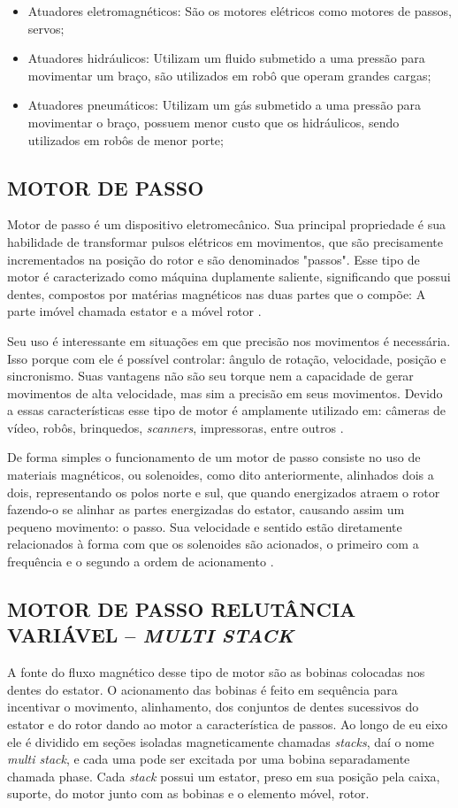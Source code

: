 \begin{itemize}
\item Atuadores eletromagnéticos: São os motores elétricos como motores de passos, servos;
\item Atuadores hidráulicos: Utilizam um fluido submetido a uma pressão para movimentar um braço, são utilizados em robô que operam grandes cargas;
\item Atuadores pneumáticos: Utilizam um gás submetido a uma pressão para movimentar o braço, possuem menor custo que os hidráulicos, sendo utilizados em robôs de menor porte;
\end{itemize}

\subsection{MOTOR DE PASSO}
Motor de passo é um dispositivo eletromecânico. Sua principal propriedade é sua habilidade de transformar pulsos elétricos em movimentos, que são precisamente incrementados na posição do rotor e são denominados "passos". Esse tipo de motor é caracterizado como máquina duplamente saliente, significando que possui dentes, compostos por matérias magnéticos nas duas partes que o compõe: A parte imóvel chamada estator e a móvel rotor \cite{demotor, acarnley2002stepping}.

Seu uso é interessante em situações em que precisão nos movimentos é necessária. Isso porque com ele é possível controlar: ângulo de rotação, velocidade, posição e sincronismo. Suas vantagens não são seu torque nem a capacidade de gerar movimentos de alta velocidade, mas sim a precisão em seus movimentos. Devido a essas características esse tipo de motor é amplamente utilizado em: câmeras de vídeo, robôs, brinquedos, \emph{scanners}, impressoras, entre outros \cite{demotor}.

De forma simples o funcionamento de um motor de passo consiste no uso de materiais magnéticos, ou solenoides, como dito anteriormente, alinhados dois a dois, representando os polos norte e sul, que quando energizados atraem o rotor fazendo-o se alinhar as partes energizadas do estator, causando assim um pequeno movimento: o passo. Sua velocidade e sentido estão diretamente relacionados à forma com que os solenoides são acionados, o primeiro com a frequência e o segundo a ordem de acionamento \cite{demotor, acarnley2002stepping,wikipedia2012stepper}.

\subsection{MOTOR DE PASSO RELUTÂNCIA VARIÁVEL – \emph{MULTI STACK}}
A fonte do fluxo magnético desse tipo de motor são as bobinas colocadas nos dentes do estator. O acionamento das bobinas é feito em sequência para incentivar o movimento, alinhamento, dos conjuntos de dentes sucessivos do estator e do rotor dando ao motor a característica de passos. Ao longo de eu eixo ele é dividido em seções isoladas magneticamente chamadas \emph{stacks}, daí o nome \emph{multi stack}, e cada uma pode ser excitada por uma bobina separadamente chamada phase. Cada \emph{stack} possui um estator, preso em sua posição pela caixa, suporte, do motor junto com as bobinas e o elemento móvel, rotor.

